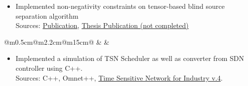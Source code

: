 \documentclass[10pt,a4paper]{article}
\begin{document}

\vspace{0.3em}
\begin{itemize}[leftmargin=*]
  \item Implemented non-negativity constraints on tensor-based blind source separation algorithm 
  \\ {\fontsize{10pt}{10pt}\selectfont\textcolor{blocktext2_color}{Sources:}} {\fontsize{10pt}{10pt}\selectfont\textcolor{blocktext2_color}{\href{https://ieeexplore.ieee.org/document/8313193}{Publication}}, {\fontsize{10pt}{10pt}\selectfont\textcolor{blocktext2_color}{\href{https://amr-aboughazala.super.site/non-negative-semi-algebraic-cp-decomposition-via-simultaneous-matrix-diagonalization}{Thesis Publication (not completed)}}}}
\end{itemize}


                             
\vspace{1em}
\begin{tabular}{@{}m{0.5cm}@{\hspace{0.5em}}m{2.2cm}@{\hspace{0.5em}}m{15cm}@{}}
   & 
  \raisebox{1.8em}{\begin{minipage}[t]{\linewidth}
  \centering
    \textcolor{blocktitle1_color}{Sep. 16}\\
    \textcolor{blocktitle1_color}{Feb. 17}
  \end{minipage} 
  } &
\end{tabular}                                

\vspace{0.3em}
\begin{itemize}[leftmargin=*]
  \item Implemented a simulation of TSN Scheduler as well as converter from SDN controller using C++.\\ {\fontsize{10pt}{10pt}\selectfont\textcolor{blocktext2_color}{\fontsize{10pt}{10pt}\selectfont\textcolor{blocktext2_color}{Sources: C++, Omnet++, }}} {\fontsize{10pt}{10pt}\selectfont\textcolor{blocktext2_color}{\href{https://1.ieee802.org/tsn/}{Time Sensitive Network for Industry v.4}}}.       
\end{itemize}              
                            
\end{document}

